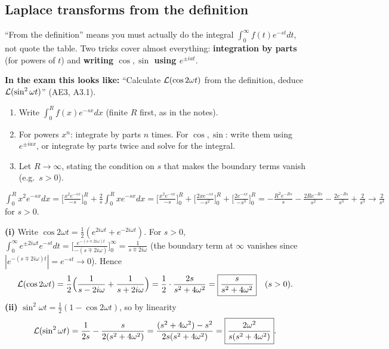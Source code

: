 \subsection{Laplace transforms from the definition}\label{sec:lapdef}\label{ss:3-3}
\begin{plainbox}
``From the definition'' means you must actually do the integral $\int_0^\infty f(t)e^{-st}dt$, not quote the table.
Two tricks cover almost everything: \textbf{integration by parts} (for powers of $t$) and \textbf{writing $\cos,\sin$ using $e^{\pm i a t}$}.
\par\smallskip\textbf{In the exam this looks like:} ``Calculate $\Lap(\cos2\omega t)$ from the definition, deduce $\Lap(\sin^2\omega t)$'' (AE3, A3.1).
\end{plainbox}
\begin{methodbox}
\begin{enumerate}
\item Write $\int_0^R f(x)e^{-sx}dx$ (finite $R$ first, as in the notes).
\item For powers $x^n$: integrate by parts $n$ times. For $\cos,\sin$: write them using $e^{\pm iax}$, or integrate by parts twice and solve for the integral.
\item Let $R\to\infty$, stating the condition on $s$ that makes the boundary terms vanish (e.g.\ $s>0$).
\end{enumerate}
\end{methodbox}

\begin{workbox}[title={Worked example \fr{88}: $\Lap(x^2)=2/s^3$}]
$\int_0^Rx^2e^{-sx}dx=\Big[\frac{x^2e^{-sx}}{-s}\Big]_0^R+\frac2s\int_0^Rxe^{-sx}dx
=\Big[\frac{x^2e^{-sx}}{-s}\Big]_0^R+\Big[\frac{2xe^{-sx}}{-s^2}\Big]_0^R+\Big[\frac{2e^{-sx}}{-s^3}\Big]_0^R
=-\frac{R^2e^{-Rs}}{s}-\frac{2Re^{-Rs}}{s^2}-\frac{2e^{-Rs}}{s^3}+\frac2{s^3}\to\frac2{s^3}$ for $s>0$.
\end{workbox}

\begin{workbox}[title={Worked example (AE3, A3.1): $\Lap(\cos2\omega t)$ and $\Lap(\sin^2\omega t)$}]
\textbf{(i)} Write $\cos2\omega t=\frac12(e^{2i\omega t}+e^{-2i\omega t})$. For $s>0$,
$\int_0^\infty e^{\pm2i\omega t}e^{-st}dt=\Big[\frac{e^{-(s\mp2i\omega)t}}{-(s\mp2i\omega)}\Big]_0^\infty=\frac{1}{s\mp2i\omega}$
(the boundary term at $\infty$ vanishes since $|e^{-(s\mp2i\omega)t}|=e^{-st}\to0$). Hence
\[\mathcal{L}(\cos2\omega t)=\frac12\Big(\frac1{s-2i\omega}+\frac1{s+2i\omega}\Big)=\frac12\cdot\frac{2s}{s^2+4\omega^2}=\boxed{\frac{s}{s^2+4\omega^2}}\quad(s>0).\]
\textbf{(ii)} $\sin^2\omega t=\frac12(1-\cos2\omega t)$, so by linearity
\[\mathcal{L}(\sin^2\omega t)=\frac1{2s}-\frac{s}{2(s^2+4\omega^2)}=\frac{(s^2+4\omega^2)-s^2}{2s(s^2+4\omega^2)}=\boxed{\frac{2\omega^2}{s(s^2+4\omega^2)}}.\]
\end{workbox}

